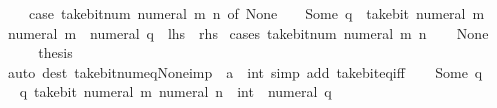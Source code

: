 \begin{isabellebody}
\ \ \ \ {\isacharparenleft}{\kern0pt}case\ take{\isacharunderscore}{\kern0pt}bit{\isacharunderscore}{\kern0pt}num\ {\isacharparenleft}{\kern0pt}numeral\ m{\isacharparenright}{\kern0pt}\ n\ of\ None\ {\isasymRightarrow}\ {}\ {\isacharbar}{\kern0pt}\ Some\ q\ {\isasymRightarrow}\ take{\isacharunderscore}{\kern0pt}bit\ {\isacharparenleft}{\kern0pt}numeral\ m{\isacharparenright}{\kern0pt}\ {\isacharparenleft}{\kern0pt}{}\ {\isacharcircum}{\kern0pt}\ numeral\ m\ {\isacharminus}{\kern0pt}\ numeral\ q{\isacharparenright}{\kern0pt}{\isacharparenright}{\kern0pt}{\isacartoucheclose}\ {\isacharparenleft}{\kern0pt}\ {\isacartoucheopen}{\isacharquery}{\kern0pt}lhs\ {\isacharequal}{\kern0pt}\ {\isacharquery}{\kern0pt}rhs{\isacartoucheclose}{\isacharparenright}{\kern0pt}\isanewline
%
\isadelimproof
%
\endisadelimproof
%
\isatagproof
{}\isamarkupfalse%
\ {\isacharparenleft}{\kern0pt}cases\ {\isacartoucheopen}take{\isacharunderscore}{\kern0pt}bit{\isacharunderscore}{\kern0pt}num\ {\isacharparenleft}{\kern0pt}numeral\ m{\isacharparenright}{\kern0pt}\ n{\isacartoucheclose}{\isacharparenright}{\kern0pt}\isanewline
\ \ \isamarkupfalse%
\ None\isanewline
\ \ \isamarkupfalse%
\ \isamarkupfalse%
\ {\isacharquery}{\kern0pt}thesis\isanewline
\ \ \ \ \isamarkupfalse%
\ {\isacharparenleft}{\kern0pt}auto\ dest{\isacharcolon}{\kern0pt}\ take{\isacharunderscore}{\kern0pt}bit{\isacharunderscore}{\kern0pt}num{\isacharunderscore}{\kern0pt}eq{\isacharunderscore}{\kern0pt}None{\isacharunderscore}{\kern0pt}imp\ {\isacharbrackleft}{\kern0pt}\ {\isacharquery}{\kern0pt}{\isacharprime}{\kern0pt}a\ {\isacharequal}{\kern0pt}\ int{\isacharbrackright}{\kern0pt}\ simp\ add{\isacharcolon}{\kern0pt}\ take{\isacharunderscore}{\kern0pt}bit{\isacharunderscore}{\kern0pt}eq{\isacharunderscore}{\kern0pt}{}{\isacharunderscore}{\kern0pt}iff{\isacharparenright}{\kern0pt}\isanewline
{}\isamarkupfalse%
\isanewline
\ \ \isamarkupfalse%
\ {\isacharparenleft}{\kern0pt}Some\ q{\isacharparenright}{\kern0pt}\isanewline
\ \ \isamarkupfalse%
\ \isamarkupfalse%
\ q{\isacharcolon}{\kern0pt}\ {\isacartoucheopen}take{\isacharunderscore}{\kern0pt}bit\ {\isacharparenleft}{\kern0pt}numeral\ m{\isacharparenright}{\kern0pt}\ {\isacharparenleft}{\kern0pt}numeral\ n\ {\isacharcolon}{\kern0pt}{\isacharcolon}{\kern0pt}\ int{\isacharparenright}{\kern0pt}\ {\isacharequal}{\kern0pt}\ numeral\ q{\isacartoucheclose}\isanewline

\end{isabellebody}
